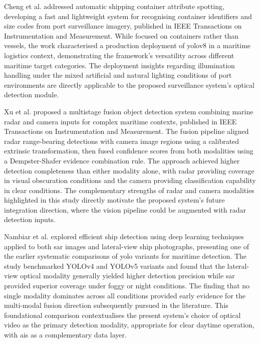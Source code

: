 Cheng et al. \cite{Cheng2025} addressed automatic shipping container attribute
spotting, developing a fast and lightweight system for recognising container
identifiers and size codes from port surveillance imagery, published in IEEE
Transactions on Instrumentation and Measurement. While focused on containers
rather than vessels, the work characterised a production deployment of \gls{yolov8}
in a maritime logistics context, demonstrating the framework's versatility across
different maritime target categories. The deployment insights regarding illumination
handling under the mixed artificial and natural lighting conditions of port
environments are directly applicable to the proposed surveillance system's
optical detection module.
 
Xu et al. \cite{Xu2025a} proposed a multistage fusion object detection system
combining marine radar and camera inputs for complex maritime contexts, published
in IEEE Transactions on Instrumentation and Measurement. The fusion pipeline
aligned radar range-bearing detections with camera image regions using a calibrated
extrinsic transformation, then fused confidence scores from both modalities using
a Dempster-Shafer evidence combination rule. The approach achieved higher detection
completeness than either modality alone, with radar providing coverage in visual
obscuration conditions and the camera providing classification capability in clear
conditions. The complementary strengths of radar and camera modalities highlighted
in this study directly motivate the proposed system's future integration direction,
where the vision pipeline could be augmented with radar detection inputs.
 
Nambiar et al. \cite{Nambiar2022} explored efficient ship detection using deep
learning techniques applied to both \gls{sar} images and lateral-view ship photographs,
presenting one of the earlier systematic comparisons of \gls{yolo} variants for maritime
detection. The study benchmarked YOLOv4 and YOLOv5 variants and found that the
lateral-view optical modality generally yielded higher detection precision while
\gls{sar} provided superior coverage under foggy or night conditions. The finding that
no single modality dominates across all conditions provided early evidence for
the multi-modal fusion direction subsequently pursued in the literature. This
foundational comparison contextualises the present system's choice of optical
video as the primary detection modality, appropriate for clear daytime operation,
with \gls{ais} as a complementary data layer.
 
